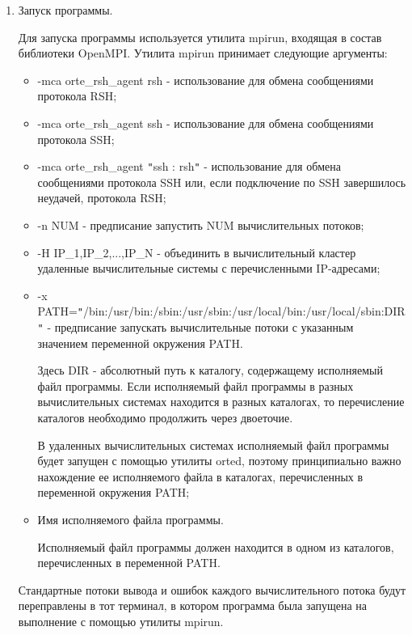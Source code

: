 \begin{enumerate}
\begin{itemize}
	\end{itemize}

	\item Запуск программы.

	Для запуска программы используется утилита mpirun, входящая в состав библиотеки OpenMPI. Утилита mpirun принимает следующие аргументы:

	\begin{itemize}

		\item -mca orte\_rsh\_agent rsh - использование для обмена сообщениями протокола RSH;
		\item -mca orte\_rsh\_agent ssh - использование для обмена сообщениями протокола SSH;
		\item -mca orte\_rsh\_agent \verb|"|ssh : rsh\verb|"| - использование для обмена сообщениями протокола SSH или, если подключение по SSH завершилось неудачей, протокола RSH;
		\item -n NUM - предписание запустить NUM вычислительных потоков;
		\item -H IP\_1,IP\_2,...,IP\_N - объединить в вычислительный кластер удаленные вычислительные системы с перечисленными IP-адресами;
		\item -x PATH=\verb|"|/bin:/usr/bin:/sbin:/usr/sbin:/usr/local/bin:/usr/local/sbin:DIR\verb|"| - предписание запускать вычислительные потоки с указанным значением переменной окружения PATH.

		Здесь DIR - абсолютный путь к каталогу, содержащему исполняемый файл программы. Если исполняемый файл программы в разных вычислительных системах находится в разных каталогах, то перечисление каталогов необходимо продолжить через двоеточие.

		В удаленных вычислительных системах исполняемый файл программы будет запущен с помощью утилиты orted, поэтому принципиально важно нахождение ее исполняемого файла в каталогах, перечисленных в переменной окружения PATH;

		\item Имя исполняемого файла программы.

		Исполняемый файл программы должен находится в одном из каталогов, перечисленных в переменной PATH.

	\end{itemize}

	Стандартные потоки вывода и ошибок каждого вычислительного потока будут переправлены в тот терминал, в котором программа была запущена на выполнение с помощью утилиты mpirun.

\end{enumerate}

